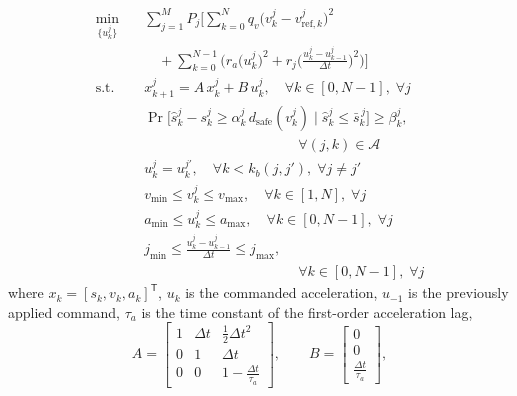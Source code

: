 \documentclass[letterpaper, 10 pt, journal]{IEEEtran}
\begin{document}
\begin{subequations} \label{eq:mpc_problem}
\begin{align}
    \min_{\{u^j_k\}} \quad
    & \sum_{j=1}^{M} P_j
      \Bigg[
        \sum_{k=0}^{N} q_v \big(v^j_k - v^j_{\mathrm{ref},k}\big)^2
      \nonumber \\
    & \quad
        + \sum_{k=0}^{N-1} \bigg(
            r_a \big(u^j_k\big)^2
            + r_j \bigg(\frac{u^j_k - u^j_{k-1}}{\Delta t}\bigg)^2
          \bigg)
      \Bigg]
      \label{eq:cost} \\
    \textrm{s.t.} \quad
    & x^j_{k+1} = A\,x^j_k + B\,u^j_k,
      \quad \forall k \in [0, N-1],\; \forall j
      \label{eq:dynamics} \\
    & \Pr\!\Big[\hat s^j_k - s^j_k \ge \alpha^j_k\, d_{\mathrm{safe}}(v^j_k)
      \;\Big|\; \hat s^j_k \le \bar s^{\,j}_k \Big] \ge \beta^j_k,
      \nonumber \\
    & \hspace{11em}
      \forall (j,k) \in \mathcal{A}
      \label{eq:safety} \\
    & u^j_k = u^{j'}_k,
      \quad \forall k < k_b(j,j'), \;
      \forall j \neq j'
      \label{eq:branch_nac} \\
    & v_{\min} \le v^j_k \le v_{\max},
      \quad \forall k \in [1, N], \; \forall j
      \label{eq:state_bound} \\
    & a_{\min} \le u^j_k \le a_{\max},
      \quad \forall k \in [0, N-1], \; \forall j
      \label{eq:input_bound} \\
    & j_{\min} \le \frac{u^j_k - u^j_{k-1}}{\Delta t} \le j_{\max},
      \nonumber \\
    & \hspace{11em}
      \forall k \in [0, N-1], \; \forall j
      \label{eq:jerk_bound}
\end{align}
\end{subequations}
where $x_k = [s_k, v_k, a_k]^\mathsf{T}$, $u_k$ is the commanded acceleration, $u_{-1}$ is the previously applied command, $\tau_a$ is the time constant of the first-order acceleration lag,
\begin{equation}
    A = \begin{bmatrix}
          1 & \Delta t & \tfrac{1}{2}\Delta t^2 \\
          0 & 1 & \Delta t \\
          0 & 0 & 1 - \tfrac{\Delta t}{\tau_a}
        \end{bmatrix}, \qquad
    B = \begin{bmatrix} 0 \\ 0 \\ \tfrac{\Delta t}{\tau_a} \end{bmatrix},
    \label{eq:ab}
\end{equation}
\end{document}
